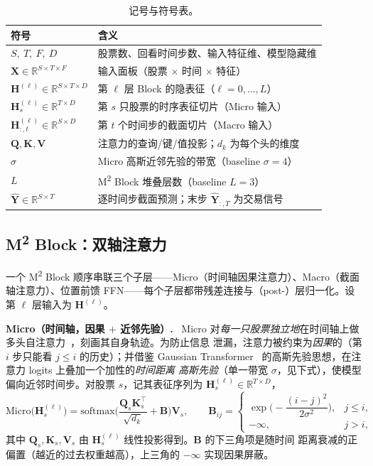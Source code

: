 \documentclass[a4paper,11pt,fontset=fandol]{ctexart}
\newcommand{\msq}{\texorpdfstring{M\textsuperscript{2}}{M2}}  %
\newcommand{\comp}[1]{\par\smallskip\noindent\textbf{\heiti #1.}\ }
\begin{document}
\begin{table}[H]
\centering
\caption{记号与符号表。}
\label{tab:notation}
\begin{tabularx}{\linewidth}{l>{\raggedright\arraybackslash}X}
\toprule
符号 & 含义 \\
\midrule
$S,\ T,\ F,\ D$ & 股票数、回看时间步数、输入特征维、模型隐藏维 \\
$\bm{X}\in\mathbb{R}^{S\times T\times F}$ & 输入面板（股票 $\times$ 时间 $\times$ 特征） \\
$\bm{H}^{(\ell)}\in\mathbb{R}^{S\times T\times D}$ & 第 $\ell$ 层 Block 的隐表征（$\ell=0,\dots,L$） \\
$\bm{H}^{(\ell)}_{s}\in\mathbb{R}^{T\times D}$ & 第 $s$ 只股票的时序表征切片（Micro 输入） \\
$\bm{H}^{(\ell)}_{:,t}\in\mathbb{R}^{S\times D}$ & 第 $t$ 个时间步的截面切片（Macro 输入） \\
$\bm{Q},\bm{K},\bm{V}$ & 注意力的查询/键/值投影；$d_k$ 为每个头的维度 \\
$\sigma$ & Micro 高斯近邻先验的带宽（baseline $\sigma{=}4$） \\
$L$ & \msq{} Block 堆叠层数（baseline $L{=}3$） \\
$\hat{\bm{Y}}\in\mathbb{R}^{S\times T}$ & 逐时间步截面预测；末步 $\hat{\bm{Y}}_{:,T}$ 为交易信号 \\
\bottomrule
\end{tabularx}
\end{table}

\subsection{\msq{} Block：双轴注意力}\label{sec:m-block}
一个 \msq{} Block 顺序串联三个子层——Micro（时间轴因果注意力）、Macro（截面轴注意力）、位置前馈
FFN——每个子层都带残差连接与（post-）层归一化。设第 $\ell$ 层输入为 $\bm{H}^{(\ell)}$。

\comp{Micro（时间轴，因果 $+$ 近邻先验）}
Micro 对\emph{每一只股票独立地}在时间轴上做多头自注意力~\cite{transformer}，刻画其自身轨迹。为防止信息
泄漏，注意力被约束为\emph{因果}的（第 $i$ 步只能看 $j\le i$ 的历史）；并借鉴 Gaussian
Transformer~\cite{gausstransformer} 的高斯先验思想，在注意力 logits 上叠加一个加性的\emph{时间距离
高斯先验}（单一带宽 $\sigma$，见下式），使模型偏向近邻时间步。对股票 $s$，记其表征序列为 $\bm{H}^{(\ell)}_{s}\in\mathbb{R}^{T\times D}$，
\begin{equation}\label{eq:micro}
\mathrm{Micro}\big(\bm{H}^{(\ell)}_{s}\big)=\mathrm{softmax}\!\Big(\frac{\bm{Q}_s\bm{K}_s^{\top}}{\sqrt{d_k}}+\bm{B}\Big)\bm{V}_s,
\qquad
\bm{B}_{ij}=\begin{cases}\exp\!\big(-\dfrac{(i-j)^2}{2\sigma^2}\big), & j\le i,\\[8pt] -\infty, & j>i,\end{cases}
\end{equation}
其中 $\bm{Q}_s,\bm{K}_s,\bm{V}_s$ 由 $\bm{H}^{(\ell)}_{s}$ 线性投影得到。$\bm{B}$ 的下三角项是随时间
距离衰减的正偏置（越近的过去权重越高），上三角的 $-\infty$ 实现因果屏蔽。
\end{document}
